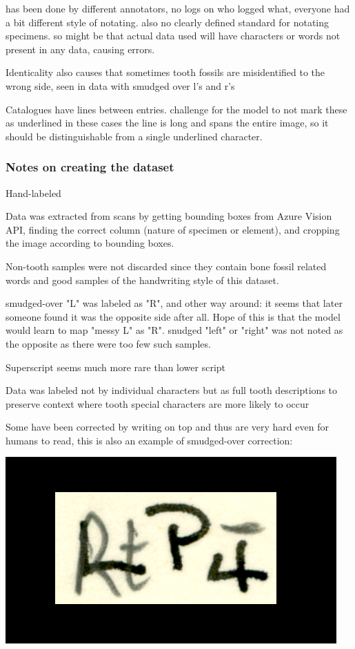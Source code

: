 \documentclass{article}
\begin{document}
has been done by different annotators, no logs on who logged what, everyone 
had a bit different style of notating. also no clearly defined standard 
for notating specimens. so might be that actual data used will have 
characters or words not present in any data, causing errors.


Identicality also causes that sometimes tooth fossils are misidentified to 
the wrong side, seen in data with smudged over l's and r's

Catalogues have lines between entries. challenge for the model to not mark these as underlined
in these cases the line is long and spans the entire image, so it should be distinguishable from 
a single underlined character.

\subsubsection{Notes on creating the dataset}

Hand-labeled

Data was extracted from scans by getting bounding boxes from Azure Vision API,
finding the correct column (nature of specimen or element), and cropping the image 
according to bounding boxes.

Non-tooth samples were not discarded since they contain 
bone fossil related words and good samples of the handwriting style of this dataset.

smudged-over "L" was labeled as "R", and other way around: it seems that later 
someone found it was the opposite side after all. Hope of this is that the model 
would learn to map "messy L" as "R". snudged "left" or "right" was not noted as the 
opposite as there were too few such samples.

Superscript seems much more rare than lower script

Data was labeled not by individual characters but as full tooth descriptions
to preserve context where tooth special characters are more likely to occur

Some have been corrected by writing on top and thus are very hard 
even for humans to read, this is also an example of smudged-over correction: 

\includegraphics*[scale=0.2]{../images/superambiguous_data_sample.png}
\end{document}
